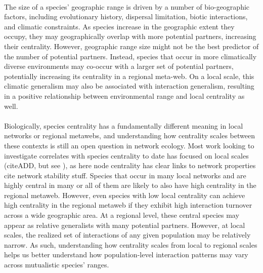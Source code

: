 \documentclass[12pt]{article}
\begin{document}
\paragraph*{}
The size of a species’ geographic range is driven by a number of bio-geographic factors, including evolutionary history, dispersal limitation, biotic interactions, and climatic constraints. As species increase in the geographic extent they occupy, they may geographically overlap with more potential partners, increasing their centrality. However, geographic range size might not be the best predictor of the number of potential partners. Instead, species that occur in more climatically diverse environments may co-occur with a larger set of potential partners, potentially increasing its centrality in a regional meta-web. On a local scale, this climatic generalism may also be associated with interaction generalism, resulting in a positive relationship between environmental range and local centrality as well. 




\paragraph*{}
Biologically, species centrality has a fundamentally different meaning in local networks or regional metawebs, and understanding how centrality scales between these contexts is still an open question in network ecology. Most work looking to investigate correlates with species centrality to date has focused on local scales (cite{ADD}, but see \cite{moulatlet2023species}), as here node centrality has clear links to network properties cite {network stability stuff}. Species that occur in many local networks and are highly central in many or all of them are likely to also have high centrality in the regional metaweb. However, even species with low local centrality can achieve high centrality in the regional metaweb if they exhibit high interaction turnover across a wide geographic area. At a regional level, these central species may appear as relative generalists with many potential partners. However, at local scales, the realized set of interactions of any given population may be relatively narrow. As such, understanding how centrality scales from local to regional scales helps us better understand how population-level interaction patterns may vary across mutualistic species' ranges. 
\end{document}
